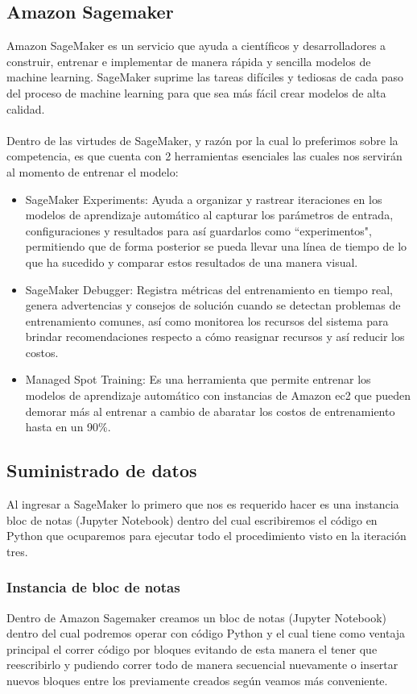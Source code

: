 \documentclass[12pt, a4paper, titlepage]{report}
\begin{document}
	\subsection{Amazon Sagemaker}
	Amazon SageMaker es un servicio que ayuda a científicos y desarrolladores a construir, entrenar e implementar de manera rápida y sencilla modelos de machine learning. SageMaker suprime las tareas difíciles y tediosas de cada paso del proceso de machine learning para que sea más fácil crear modelos de alta calidad.\\\\
	Dentro de las virtudes de SageMaker, y razón por la cual lo preferimos sobre la competencia, es que cuenta con 2 herramientas esenciales las cuales nos servirán al momento de entrenar el modelo:
	\begin{itemize}
	\item SageMaker Experiments: Ayuda a organizar y rastrear iteraciones en los modelos de aprendizaje automático al capturar los parámetros de entrada, configuraciones y resultados para así guardarlos como “experimentos", permitiendo que de forma posterior se pueda llevar una línea de tiempo de lo que ha sucedido y comparar estos resultados de una manera visual.
	\item SageMaker Debugger: Registra métricas del entrenamiento en tiempo real, genera advertencias y consejos de solución cuando se detectan problemas de entrenamiento comunes, así como monitorea los recursos del sistema para brindar recomendaciones respecto a cómo reasignar recursos y así reducir los costos.
	\item Managed Spot Training: Es una herramienta que permite entrenar los modelos de aprendizaje automático con instancias de Amazon \acrshort{ec2} que pueden demorar más al entrenar a cambio de abaratar los costos de entrenamiento hasta en un 90\%.
	\end{itemize}
	\newpage
	
	\subsection{Suministrado de datos}
	Al ingresar a SageMaker lo primero que nos es requerido hacer es una instancia bloc de notas (Jupyter Notebook) dentro del cual escribiremos el código en Python que ocuparemos para ejecutar todo el procedimiento visto en la iteración tres.
	
		\subsubsection*{Instancia de bloc de notas}
		Dentro de Amazon Sagemaker creamos un bloc de notas (Jupyter Notebook) dentro del cual podremos operar con código Python y el cual tiene como ventaja principal el correr código por bloques evitando de esta manera el tener que reescribirlo y pudiendo correr todo de manera secuencial nuevamente o insertar nuevos bloques entre los previamente creados según veamos más conveniente.\\
		
\end{document}
